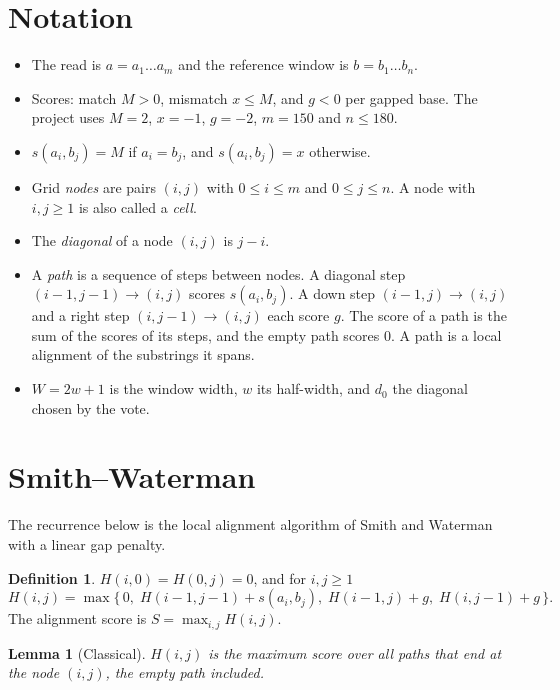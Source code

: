 \documentclass[11pt]{article}
\theoremstyle{plain}
\newtheorem{lemma}[theorem]{Lemma}
\theoremstyle{definition}
\newtheorem*{definition}{Definition}
\theoremstyle{remark}
\begin{document}
\section{Notation}

\begin{itemize}[nosep]
\item The read is $a = a_1 \dots a_m$ and the reference window is $b = b_1 \dots b_n$.
\item Scores: match $M > 0$, mismatch $x \le M$, and $g < 0$ per gapped base.
      The project uses $M = 2$, $x = -1$, $g = -2$, $m = 150$ and $n \le 180$.
\item $s(a_i, b_j) = M$ if $a_i = b_j$, and $s(a_i,b_j) = x$ otherwise.
\item Grid \emph{nodes} are pairs $(i,j)$ with $0 \le i \le m$ and $0 \le j \le n$.
      A node with $i, j \ge 1$ is also called a \emph{cell}.
\item The \emph{diagonal} of a node $(i,j)$ is $j - i$.
\item A \emph{path} is a sequence of steps between nodes. A diagonal step
      $(i-1,j-1) \to (i,j)$ scores $s(a_i,b_j)$. A down step $(i-1,j) \to (i,j)$
      and a right step $(i,j-1) \to (i,j)$ each score $g$. The score of a path is
      the sum of the scores of its steps, and the empty path scores $0$. A path is
      a local alignment of the substrings it spans.
\item $W = 2w + 1$ is the window width, $w$ its half-width, and $d_0$ the diagonal
      chosen by the vote.
\end{itemize}

\section{Smith--Waterman}

The recurrence below is the local alignment algorithm of Smith and
Waterman~\cite{smith1981} with a linear gap penalty.

\begin{definition}
$H(i,0) = H(0,j) = 0$, and for $i, j \ge 1$
\begin{equation}\label{eq:sw}
H(i,j) = \max\bigl\{\,0,\; H(i-1,j-1) + s(a_i,b_j),\; H(i-1,j) + g,\; H(i,j-1) + g \,\bigr\}.
\end{equation}
The alignment score is $S = \max_{i,j} H(i,j)$.
\end{definition}

\begin{lemma}[Classical]\label{lem:paths}
$H(i,j)$ is the maximum score over all paths that end at the node $(i,j)$, the
empty path included.
\end{lemma}
\end{document}
